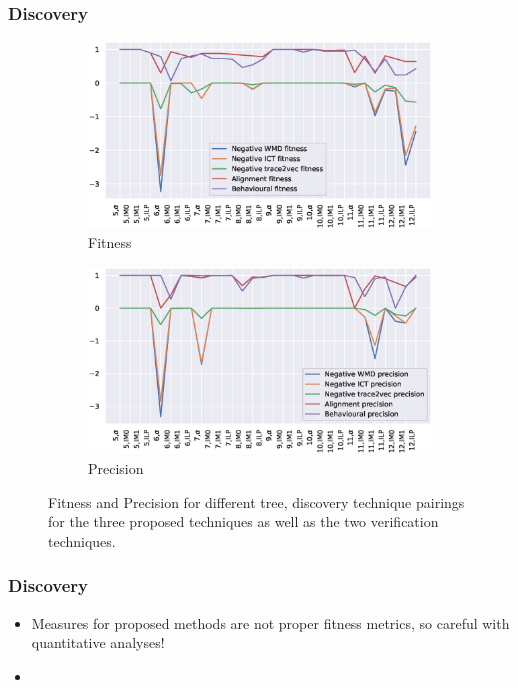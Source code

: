 \documentclass{beamer}
\begin{document}
	
	\begin{frame}
		\frametitle{Discovery}
		\begin{figure}
			\centering
			\begin{subfigure}[b]{0.49\textwidth}
				\centering
				\includegraphics[width=\textwidth]{figures/fitness}
				\caption{Fitness}
				\label{fig:fitness}
			\end{subfigure}
			\hfill
			\begin{subfigure}[b]{0.49\textwidth}
				\centering
				\includegraphics[width=\textwidth]{figures/precision}
				\caption{Precision}
				\label{fig:precision}
			\end{subfigure}
			\caption{Fitness and Precision for different tree, discovery technique pairings for the three proposed techniques as well as the two verification techniques.}
			\label{fig:discovery}
		\end{figure}
	\end{frame}
	
	\begin{frame}
		\frametitle{Discovery}
		\begin{itemize}
			\item Measures for proposed methods are not proper fitness metrics, so careful with quantitative analyses!
			\item 
		\end{itemize}
	\end{frame}
	
\end{document}

